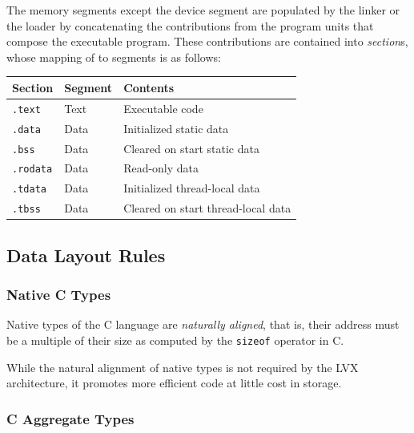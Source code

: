 The memory segments except the device segment are populated by the linker or the
loader by concatenating the contributions from the program units that compose
the executable program. These contributions are contained into \emph{section}s,
whose mapping of to segments is as follows:

\begin{center}
\begin{tabular}{|l|l|l|} \hline
Section & Segment & Contents \\ \hline
\texttt{.text} & Text & Executable code \\
\texttt{.data} & Data & Initialized static data \\
\texttt{.bss} & Data & Cleared on start static data \\
\texttt{.rodata} & Data & Read-only data \\
\texttt{.tdata} & Data & Initialized thread-local data \\
\texttt{.tbss} & Data & Cleared on start thread-local data \\
\hline \end{tabular}
\end{center}


\subsection{Data Layout Rules}

\subsubsection{Native C Types}

Native types of the C language are \emph{naturally aligned}, that is, their
address must be a multiple of their size as computed by the \texttt{sizeof}
operator in C.

While the natural alignment of native types is not required by the LVX
architecture, it promotes more efficient code at little cost in storage.

\subsubsection{C Aggregate Types}

